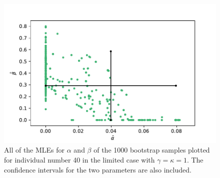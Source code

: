 \begin{figure}
    \centering
    \includegraphics[scale=0.5]{pictures/ci_lim_a_b_person40_pdf.pdf}
    \caption[MLEs for $\alpha$ and $\beta$ for bootstrap samples individual 40, limited]{All of the MLEs for $\alpha$ and $\beta$ of the 1000 bootstrap samples plotted for individual number 40 in the limited case with $\gamma=\kappa=1$. The confidence intervals for the two parameters are also included.}
    \label{fig:ci_lim_a_b_person40}
\end{figure}
